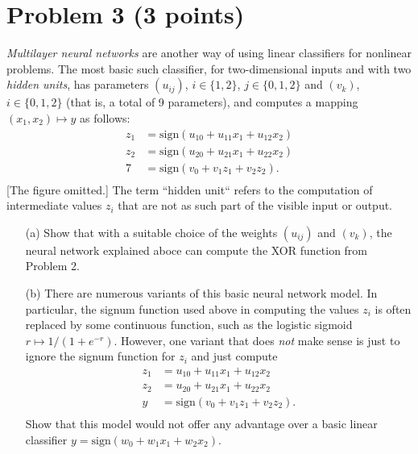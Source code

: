 \documentclass[10pt]{article}
\begin{document}
\section*{Problem 3 (3 points)}
\color{blue}
\textit{Multilayer neural networks} are another way of using linear classifiers for nonlinear problems. The most basic such classifier, for two-dimensional inputs and with two \textit{hidden units}, has parameters $(u_{ij})$, $i \in \{ 1, 2 \}$, $j \in \{ 0, 1, 2 \}$ and $(v_k)$, $i \in \{ 0, 1, 2 \}$ (that is, a total of 9 parameters), and computes a mapping $(x_1, x_2) \mapsto y$ as follows:
\begin{align*}
z_1 &= \text{sign}(u_{10} + u_{11} x_1 + u_{12} x_2) \\
z_2 &= \text{sign}(u_{20} + u_{21} x_1 + u_{22} x_2) \\
7 &= \text{sign}(v_0 + v_1 z_1 + v_2 z_2). \\
\end{align*}
[The figure omitted.]
The term ``hidden unit`` refers to the computation of intermediate values $z_i$ that are not as such part of the visible input or output.
\begin{itemize}
\item[(a)] Show that with a suitable choice of the weights $(u_{ij})$ and $(v_k)$, the neural network explained aboce can compute the XOR function from Problem 2.
\item[(b)] There are numerous variants of this basic neural network model. In particular, the signum function used above in computing the values $z_i$ is often replaced by some continuous function, such as the logistic sigmoid $r \mapsto 1/(1 + e^{-r})$. However, one variant that does \textit{not} make sense is just to ignore the signum function for $z_i$ and just compute
\begin{align*}
z_1 &= u_{10} + u_{11} x_1 + u_{12} x_2 \\
z_2 &= u_{20} + u_{21} x_1 + u_{22} x_2 \\
y   &= \text{sign}(v_0 + v_1 z_1 + v_2 z_2). \\
\end{align*}
Show that this model would not offer any advantage over a basic linear classifier $y = \text{sign}(w_0 + w_1 x_1 + w_2 x_2).$
\end{itemize}
\color{black}
\end{document}
